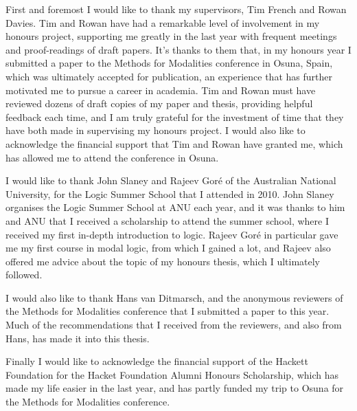 \begin{acknowledgements}
First and foremost I would like to thank my supervisors, Tim French and Rowan
Davies. Tim and Rowan have had a remarkable level of involvement in my honours
project, supporting me greatly in the last year with frequent meetings and
proof-readings of draft papers. It's thanks to them that, in my honours year I
submitted a paper to the Methods for Modalities conference in Osuna, Spain,
which was ultimately accepted for publication, an experience that has further
motivated me to pursue a career in academia. Tim and Rowan must have reviewed
dozens of draft copies of my paper and thesis, providing helpful feedback each
time, and I am truly grateful for the investment of time that they have both
made in supervising my honours project. I would also like to acknowledge the
financial support that Tim and Rowan have granted me, which has allowed me to
attend the conference in Osuna.

I would like to thank John Slaney and Rajeev Gor\'{e} of the Australian National
University, for the Logic Summer School that I attended in 2010. John Slaney
organises the Logic Summer School at ANU each year, and it was thanks to him and
ANU that I received a scholarship to attend the summer school, where I received
my first in-depth introduction to logic. Rajeev Gor\'{e} in particular gave me
my first course in modal logic, from which I gained a lot, and Rajeev also
offered me advice about the topic of my honours thesis, which I ultimately
followed.

I would also like to thank Hans van Ditmarsch, and the anonymous reviewers of
the Methods for Modalities conference that I submitted a paper to this year.
Much of the recommendations that I received from the reviewers, and also from
Hans, has made it into this thesis.

Finally I would like to acknowledge the financial support of the Hackett
Foundation for the Hacket Foundation Alumni Honours Scholarship, which has made
my life easier in the last year, and has partly funded my trip to Osuna for the
Methods for Modalities conference.
\end{acknowledgements}
